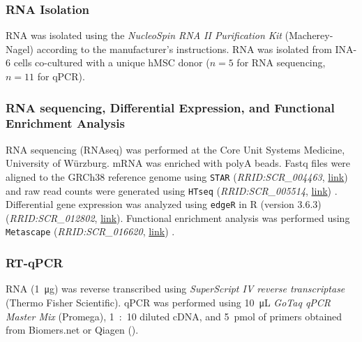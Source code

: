 \subsubsection*{RNA Isolation}%
\label{C1:methods_rna}%
RNA was isolated using the \textit{NucleoSpin RNA II Purification Kit}
(Macherey-Nagel) according to the manufacturer's instructions. RNA was isolated
from INA-6 cells co-cultured with a unique hMSC donor ($n=5$ for RNA sequencing, $n=11$
for qPCR).

\subsubsection*{RNA sequencing, Differential Expression, and Functional Enrichment Analysis}%
\label{C1:methods_rnaseq}%
RNA sequencing (RNAseq) was performed at the Core Unit Systems Medicine,
University of Würzburg. mRNA was enriched with polyA beads. Fastq files were
aligned to the GRCh38 reference genome using \texttt{STAR}
(\textit{RRID:SCR\_004463},
\href{https://scicrunch.org/resolver/RRID:SCR_004463}{link}) and raw read
counts were generated using \texttt{HTseq} (\textit{RRID:SCR\_005514},
\href{https://scicrunch.org/resolver/SCR_005514}{link})
\cite{andersHTSeqPythonFramework2015,dobinSTARUltrafastUniversal2013,zerbinoEnsembl20182018}.
Differential gene expression was analyzed using \texttt{edgeR} in R (version
3.6.3) (\textit{RRID:SCR\_012802},
\href{https://scicrunch.org/resolver/SCR_012802}{link}). Functional
enrichment analysis was performed using \texttt{Metascape}
(\textit{RRID:SCR\_016620},
\href{https://scicrunch.org/resolver/SCR_016620}{link})
\cite{zhouMetascapeProvidesBiologistoriented2019}.


\subsubsection*{RT-qPCR}%
\label{C1:methods_rtqpcr}%
RNA (\SI{1}{\micro\gram}) was reverse transcribed using \textit{SuperScript IV
    reverse transcriptase} (Thermo Fisher Scientific). qPCR was performed using
\SI{10}{\micro\liter} \textit{GoTaq qPCR Master Mix} (Promega), \SI{1}{:10}
diluted cDNA, and \SI{5}{pmol} of primers obtained from Biomers.net or Qiagen
().


